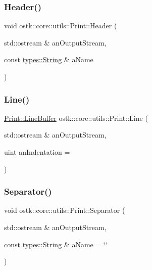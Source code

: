 \subsubsection{\texorpdfstring{Header()}{Header()}}
{\footnotesize\ttfamily void ostk\+::core\+::utils\+::\+Print\+::\+Header (\begin{DoxyParamCaption}\item[{std\+::ostream \&}]{an\+Output\+Stream,  }\item[{const \hyperlink{classostk_1_1core_1_1types_1_1_string}{types\+::\+String} \&}]{a\+Name }\end{DoxyParamCaption})\hspace{0.3cm}{\ttfamily [static]}}

\mbox{\label{classostk_1_1core_1_1utils_1_1_print_a1aeb071e217dabc5df02b5692d3d3e10}} 
\subsubsection{\texorpdfstring{Line()}{Line()}}
{\footnotesize\ttfamily \hyperlink{classostk_1_1core_1_1utils_1_1_print_1_1_line_buffer}{Print\+::\+Line\+Buffer} ostk\+::core\+::utils\+::\+Print\+::\+Line (\begin{DoxyParamCaption}\item[{std\+::ostream \&}]{an\+Output\+Stream,  }\item[{uint}]{an\+Indentation = {} }\end{DoxyParamCaption})\hspace{0.3cm}{\ttfamily [static]}}

\mbox{\label{classostk_1_1core_1_1utils_1_1_print_a4269f70cba2a05eb79a21756a38bb68b}} 
\subsubsection{\texorpdfstring{Separator()}{Separator()}}
{\footnotesize\ttfamily void ostk\+::core\+::utils\+::\+Print\+::\+Separator (\begin{DoxyParamCaption}\item[{std\+::ostream \&}]{an\+Output\+Stream,  }\item[{const \hyperlink{classostk_1_1core_1_1types_1_1_string}{types\+::\+String} \&}]{a\+Name = {\ttfamily \char`\"{}\char`\"{}} }\end{DoxyParamCaption})\hspace{0.3cm}{\ttfamily [static]}}




